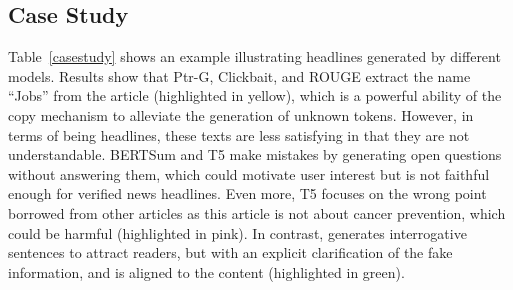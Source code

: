 

\subsection{Case Study}
Table~\ref{casestudy} shows an example illustrating headlines generated by
different models. 
Results show that Ptr-G, Clickbait, and ROUGE extract the name ``Jobs'' from
the article (highlighted in yellow), which is a powerful ability of the copy
mechanism to alleviate the generation of unknown tokens.
However, in terms of being headlines, these texts are less satisfying in that
they are not understandable. BERTSum and T5 make mistakes by generating open
questions without answering them, which could motivate user interest but is not
faithful enough for verified news headlines. Even more, T5 focuses on the wrong
point borrowed from other articles as this article is not about cancer
prevention, 
which could be harmful (highlighted in pink). In contrast, \modelname
generates interrogative sentences to attract readers, but with an explicit
clarification of the fake information, and is aligned to the content
(highlighted in green).